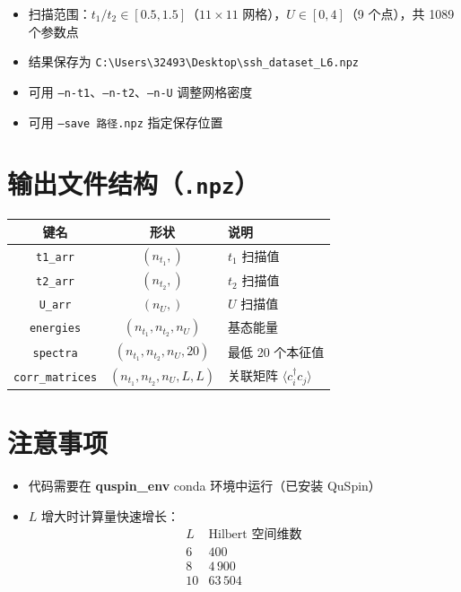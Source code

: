 \documentclass[12pt,a4paper]{article}
\begin{document}
\begin{itemize}[nosep]
    \item 扫描范围：$t_1/t_2 \in [0.5, 1.5]$（$11\times 11$ 网格），$U \in [0, 4]$（9 个点），共 1089 个参数点
    \item 结果保存为 \texttt{C:\textbackslash Users\textbackslash 32493\textbackslash Desktop\textbackslash ssh\_dataset\_L6.npz}
    \item 可用 \texttt{--n-t1}、\texttt{--n-t2}、\texttt{--n-U} 调整网格密度
    \item 可用 \texttt{--save 路径.npz} 指定保存位置
\end{itemize}

\section{输出文件结构（\texttt{.npz}）}
\renewcommand{\arraystretch}{1.2}
\begin{table}[h!]
\centering
\begin{tabular}{ccl}
\toprule
键名 & 形状 & 说明 \\
\midrule
\texttt{t1\_arr}    & $(n_{t_1},)$ & $t_1$ 扫描值 \\
\texttt{t2\_arr}    & $(n_{t_2},)$ & $t_2$ 扫描值 \\
\texttt{U\_arr}     & $(n_{U},)$   & $U$ 扫描值 \\
\texttt{energies}   & $(n_{t_1}, n_{t_2}, n_{U})$ & 基态能量 \\
\texttt{spectra}    & $(n_{t_1}, n_{t_2}, n_{U}, 20)$ & 最低 20 个本征值 \\
\texttt{corr\_matrices} & $(n_{t_1}, n_{t_2}, n_{U}, L, L)$ & 关联矩阵 $\langle c_i^\dagger c_j \rangle$ \\
\bottomrule
\end{tabular}
\end{table}

\section{注意事项}
\begin{itemize}
    \item 代码需要在 \textbf{quspin\_env} conda 环境中运行（已安装 QuSpin）
    \item $L$ 增大时计算量快速增长：
    \[
    \begin{array}{c|c}
    L & \text{Hilbert 空间维数} \\ \hline
    6 & 400 \\
    8 & 4\,900 \\
    10 & 63\,504
    \end{array}
    \]
\end{itemize}
\end{document}
